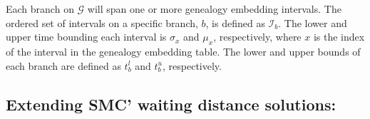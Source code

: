 \documentclass[11pt]{article}
\begin{document}
Each branch on $\mathcal{G}$ will span one or more genealogy embedding 
intervals. The ordered set of intervals on a specific branch, $b$, is 
defined as $\mathcal{I}_b$. The lower and upper time bounding each interval is 
$\sigma_x$ and $\mu_x$, respectively, where $x$ is the index of the 
interval in the genealogy embedding table. The lower and upper bounds of
each branch are defined as $t_b^l$ and $t_b^u$, respectively. 







\subsection{Extending SMC' waiting distance solutions:}

\end{document}
